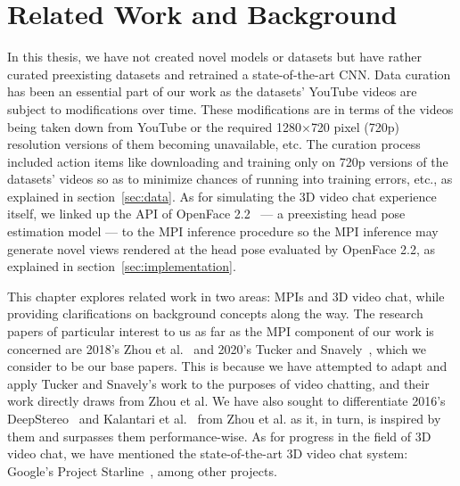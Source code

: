 \chapter{Related Work and Background}\label{ch2:related-work-background}

In this thesis, we have not created novel models or datasets but have rather curated preexisting datasets and retrained a state-of-the-art CNN. Data curation has been an essential part of our work as the datasets' YouTube videos are subject to modifications over time. These modifications are in terms of the videos being taken down from YouTube or the required 1280$\times$720 pixel (720p) resolution versions of them becoming unavailable, etc. The curation process included action items like downloading and training only on 720p versions of the datasets' videos so as to minimize chances of running into training errors, etc., as explained in section~\ref{sec:data}. As for simulating the 3D video chat experience itself, we linked up the API of OpenFace 2.2~\cite{baltrusaitis_openface_2018} --- a preexisting head pose estimation model --- to the MPI inference procedure so the MPI inference may generate novel views rendered at the head pose evaluated by OpenFace 2.2, as explained in section~\ref{sec:implementation}.

This chapter explores related work in two areas: MPIs and 3D video chat, while providing clarifications on background concepts along the way. The research papers of particular interest to us as far as the MPI component of our work is concerned are 2018's Zhou et al.~\cite{zhou2018stereo} and 2020's Tucker and Snavely~\cite{single_view_mpi}, which we consider to be our base papers. This is because we have attempted to adapt and apply Tucker and Snavely's work to the purposes of video chatting, and their work directly draws from Zhou et al. We have also sought to differentiate 2016's DeepStereo~\cite{deep_stereo_2016} and Kalantari et al.~\cite{kalantari_2016} from Zhou et al. as it, in turn, is inspired by them and surpasses them performance-wise. As for progress in the field of 3D video chat, we have mentioned the state-of-the-art 3D video chat system: Google's Project Starline~\cite{lawrence_project_2021}, among other projects.


